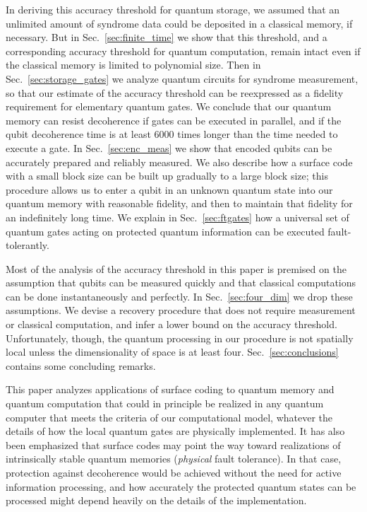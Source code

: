 In deriving this accuracy threshold for quantum storage, we assumed that an unlimited amount of syndrome data could be deposited in a classical memory, if necessary. But in Sec.~\ref{sec:finite_time} we show that this threshold, and a corresponding accuracy threshold for quantum computation, remain intact even if the classical memory is limited to polynomial size. Then in Sec.~\ref{sec:storage_gates} we analyze quantum circuits for syndrome measurement, so that our estimate of the accuracy threshold can be reexpressed as a fidelity requirement for elementary quantum gates. We conclude that our quantum memory can resist decoherence if gates can be executed in parallel, and if the qubit decoherence time is at least $6000$ times longer than the time needed to execute a gate. In Sec.~\ref{sec:enc_meas} we show that encoded qubits can be accurately prepared and reliably measured. We also describe how a surface code with a small block size can be built up gradually to a large block size; this procedure allows us to enter a qubit in an unknown quantum state into our quantum memory with reasonable fidelity, and then to maintain that fidelity for an indefinitely long time. We explain in Sec.~\ref{sec:ftgates} how a universal set of quantum gates acting on protected quantum information can be executed fault-tolerantly.

Most of the analysis of the accuracy threshold in this paper is premised on the assumption that qubits can be measured quickly and that classical computations can be done instantaneously and perfectly. In Sec.~\ref{sec:four_dim} we drop these assumptions. We devise a recovery procedure that does not require measurement or classical computation, and infer a lower bound on the accuracy threshold. Unfortunately, though, the quantum processing in our procedure is not spatially local unless the dimensionality of space is at least four. Sec.~\ref{sec:conclusions} contains some concluding remarks.

This paper analyzes applications of surface coding to quantum memory and quantum computation that could in principle be realized in any quantum computer that meets the criteria of our computational model, whatever the details of how the local quantum gates are physically implemented. It has also been emphasized \cite{kitaev1,kitaev2} that surface codes may point the way toward realizations of intrinsically stable quantum memories ({\em physical} fault tolerance). In that case, protection against decoherence would be achieved without the need for active information processing, and how accurately the protected quantum states can be processed might depend heavily on the details of the implementation. 



